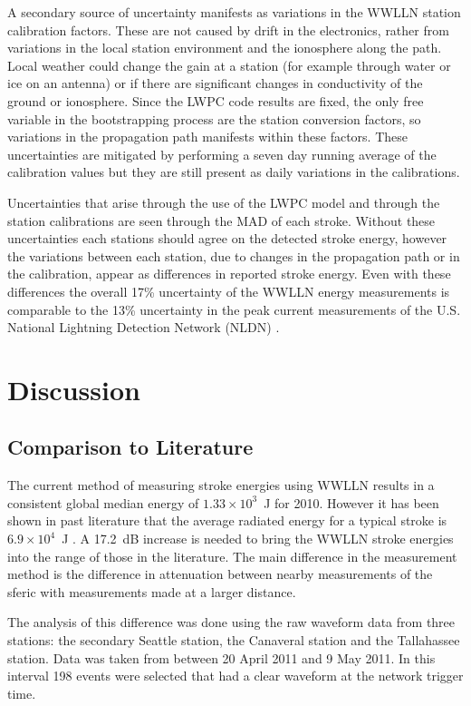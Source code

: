 A secondary source of uncertainty manifests as variations in the WWLLN station calibration factors.
These are not caused by drift in the electronics, rather from variations in the local station environment and the ionosphere along the path.
Local weather could change the gain at a station (for example through water or ice on an antenna) or if there are significant changes in conductivity of the ground or ionosphere.
Since the LWPC code results are fixed, the only free variable in the bootstrapping process are the station conversion factors, so variations in the propagation path manifests within these factors.
These uncertainties are mitigated by performing a seven day running average of the calibration values but they are still present as daily variations in the calibrations.

Uncertainties that arise through the use of the LWPC model and through the station calibrations are seen through the MAD of each stroke.
Without these uncertainties each stations should agree on the detected stroke energy, however the variations between each station, due to changes in the propagation path or in the calibration, appear as differences in reported stroke energy.
Even with these differences the overall 17\% uncertainty of the WWLLN energy measurements is comparable to the 13\% uncertainty in the peak current measurements of the U.S. National Lightning Detection Network (NLDN) \citep{Nag2011}.

\section{Discussion}

\subsection{Comparison to Literature}

The current method of measuring stroke energies using WWLLN results in a consistent global median energy of $1.33 \times 10^3$~J for 2010.
However it has been shown in past literature that the average radiated energy for a typical stroke is $6.9 \times 10^{4}$~J \citep{Taylor1963}.
A 17.2~dB increase is needed to bring the WWLLN stroke energies into the range of those in the literature.
The main difference in the measurement method is the difference in attenuation between nearby measurements of the sferic with measurements made at a larger distance.

The analysis of this difference was done using the raw waveform data from three stations: the secondary Seattle station, the Canaveral station and the Tallahassee station.
Data was taken from between 20 April 2011 and 9 May 2011. In this interval 198 events were selected that had a clear waveform at the network trigger time.

